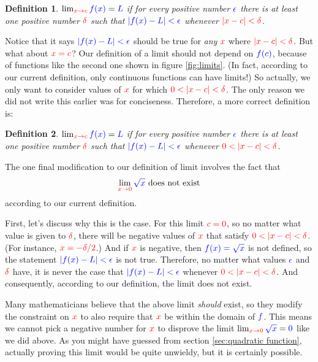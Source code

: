 \documentclass{myarticle}
\newcommand{\hor}[1]{\textcolor{red}{#1}} %
\newcommand{\ver}[1]{\textcolor{blue}{#1}}
\theoremstyle{nospace}
\newtheorem*{oldattempt}{Definition}
\newenvironment{attempt}{\begin{mdframed}\begin{oldattempt}}{\end{oldattempt}\end{mdframed}}
\newtheorem{old series theorem}{Theorem}
\newenvironment{series theorem}{\begin{mdframed}\begin{old series theorem}}{\end{old series theorem}\end{mdframed}}
\begin{document}
\begin{attempt} $\lim_{\hor{x \to c}} \ver{f(x)} = \ver{L}$ if for every positive number $\ver{\epsilon}$ there is at least one positive number $\hor{\delta}$ such that $\ver{|f(x) - L| < \epsilon}$ whenever $\hor{|x - c| < \delta}$. \end{attempt}

Notice that it says $\ver{|f(x) - L| < \epsilon}$ should be true for \emph{any} $\hor{x}$ where $\hor{|x - c| < \delta}$. But what about $\hor{x = c}$? Our definition of a limit should not depend on $\ver{f(c)}$, because of functions like the second one shown in figure \ref{fig:limits}. (In fact, according to our current definition, only continuous functions can have limits!) So actually, we only want to consider values of $\hor{x}$ for which $\hor{0 < |x - c| < \delta}$. The only reason we did not write this earlier was for conciseness. Therefore, a more correct definition is:

\begin{attempt} $\lim_{\hor{x \to c}} \ver{f(x)} = \ver{L}$ if for every positive number $\ver{\epsilon}$ there is at least one positive number $\hor{\delta}$ such that $\ver{|f(x) - L| < \epsilon}$ whenever $\hor{0 < |x - c| < \delta}$. \end{attempt}

The one final modification to our definition of limit involves the fact that \[ \lim_{\hor{x \to 0}} \ver{\sqrt{x}}\text{ does not exist} \] according to our current definition.

First, let's discuss why this is the case. For this limit $\hor{c = 0}$, so no matter what value is given to $\hor{\delta}$, there will be negative values of $\hor{x}$ that satisfy $\hor{0 < |x - c| < \delta}$. (For instance, $\hor{x = -\delta/2}$.) And if $\hor{x}$ is negative, then $\ver{f(x) = \sqrt{x}}$ is not defined, so the statement $\ver{|f(x) - L| < \epsilon}$ is not true. Therefore, no matter what values $\ver{\epsilon}$ and $\hor{\delta}$ have, it is never the case that $\ver{|f(x) - L| < \epsilon}$ whenever $\hor{0 < |x - c| < \delta}$. And consequently, according to our definition, the limit does not exist.

Many mathematicians believe that the above limit \emph{should} exist, so they modify the constraint on $\hor{x}$ to also require that $\hor{x}$ be within the domain of $\ver{f}$. This means we cannot pick a negative number for $\hor{x}$ to disprove the limit $\lim_{\hor{x \to 0}} \ver{\sqrt{x}} = \ver{0}$ like we did above. As you might have guessed from section \ref{sec:quadratic function}, actually proving this limit would be quite unwieldy, but it is certainly possible.
\end{document}
